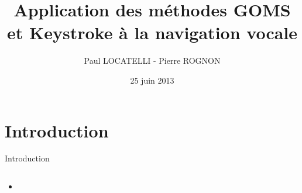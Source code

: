 \documentclass{beamer}
\title[Navigation vocale]{Application des méthodes GOMS et
Keystroke à la navigation vocale}
\author[]{Paul LOCATELLI - Pierre ROGNON}
\institute[UTBM]{Université de Technologies de Belfort-Montbéliard}
\date{25 juin 2013}
\begin{document}
\begin{frame}{}
	
	\maketitle	
	
\end{frame}

	\section*{Introduction}

\begin{frame}{Introduction}


	\begin{columns}[c]
	
	\begin{column}{5cm}
   		\begin{itemize}
			\item 
		\end{itemize}
  	\end{column}
	\begin{column}{5cm}
  	\end{column}
	
	\end{columns}
    	
\end{frame}


	
\end{document}
